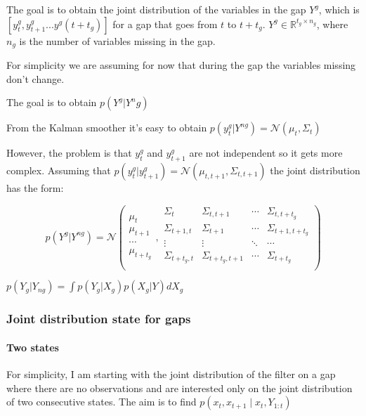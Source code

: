 \documentclass{article}
\begin{document}
The goal is to obtain the joint distribution of the variables in the gap $Y^g$, which is $[y^g_t, y^g_{t+1} ... y^g(t+t_g)]$
for a gap that goes from $t$ to $t+t_g$. $Y^g \in \mathbb{R}^{t_g \times n_g}$, where $n_g$ is the number of variables missing in the gap.

For simplicity we are assuming for now that during the gap the variables missing don't change.

The goal is to obtain $p(Y^g|Y^ng)$

From the Kalman smoother it's easy to obtain $p(y^g_t|Y^{ng}) = \mathcal{N}(\mu_{t}, \Sigma_{t})$

However, the problem is that $y^g_t$ and $y^g_{t+1}$ are not independent so it gets more complex.
Assuming that $p(y^g_t|y^g_{t+1}) = \mathcal{N}(\mu_{t,t+1}, \Sigma_{t,t+1})$ the joint distribution has the form:

$$ p(Y^g|Y^{ng}) = \mathcal{N}\left(\begin{array}{c}
     \mu_{t}   \\
     \mu_{t+1} \\
     \cdots    \\
     \mu_{t+t_g}
\end{array},
\begin{array}{cccc}
    \Sigma_{t}       & \Sigma_{t,t+1}     & \cdots & \Sigma_{t,t+t_g}   \\
    \Sigma_{t+1,t}   & \Sigma_{t+1}       & \cdots & \Sigma_{t+1,t+t_g} \\
    \vdots           & \vdots             & \ddots & \cdots             \\ 
    \Sigma_{t+t_g,t} & \Sigma_{t+t_g,t+1} & \cdots & \Sigma_{t+t_g}     \\
\end{array}\right)$$


$p(Y_g|Y_{ng}) = \int p(Y_g|X_g)p(X_g|Y)dX_g$


\subsubsection{Joint distribution state for gaps}

\paragraph{Two states}

For simplicity, I am starting with the joint distribution of the filter on a gap where there are no observations and are interested only on the joint distribution of two consecutive states.
The aim is to find $p(x_t, x_{t+1}\mid x_t, Y_{1:t})$
\end{document}

